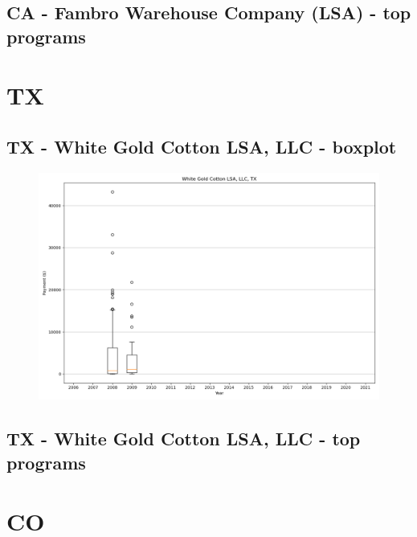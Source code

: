 \subsection*{CA - Fambro Warehouse Company (LSA) - top programs}

\newpage
\section*{TX}
\subsection*{TX - White Gold Cotton LSA, LLC - boxplot}
\begin{figure}[h]
\centering
\includegraphics[width=7in]{../output/boxplots/counties/White Gold Cotton LSA, LLC-TX_boxplot.png}
\end{figure}


\subsection*{TX - White Gold Cotton LSA, LLC - top programs}

\newpage
\section*{CO}
